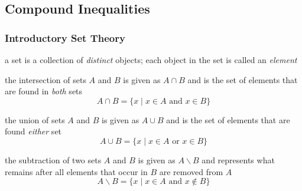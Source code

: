 \setcounter{section}{9}
\setcounter{subsection}{1}

\subsection{Compound Inequalities}

\subsubsection*{Introductory Set Theory}

\begin{definition}[Set]
a set is a collection of \emph{distinct} objects; each object in the set is called an \emph{element}
\end{definition}

\vspace{.2in}
\begin{definition}
the intersection of sets $A$ and $B$ is given as $A\cap B$ and is the set of elements that are found in \emph{both} sets
\[A \cap B = \{x \mid x \in A \text{ and } x \in B\}\]

\end{definition}

\vspace{.2in}
\begin{definition}
the union of sets $A$ and $B$ is given as $A \cup B$ and is the set of elements that are found \emph{either} set
\[A \cup B = \{x \mid x \in A \text{ or } x \in B\}\]
\end{definition}

\vspace{.2in}
\begin{definition}
the subtraction of two sets $A$ and $B$ is given as $A\backslash B$ and represents what remains after all elements that occur in $B$ are removed from $A$
\[ A\backslash B = \{x \mid x \in A \text{ and } x \notin B\}\]
\end{definition}

